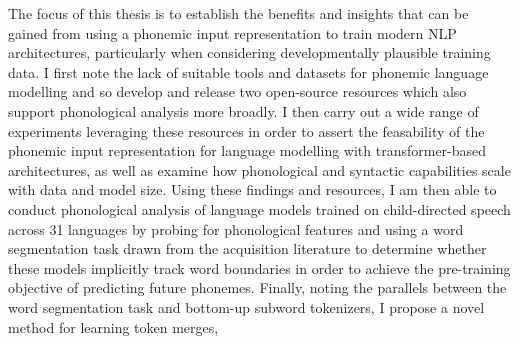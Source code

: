 
The focus of this thesis is to establish the benefits and insights that can be gained from using a phonemic input representation to train modern NLP architectures, particularly when considering developmentally plausible training data. I first note the lack of suitable tools and datasets for phonemic language modelling and so develop and release two open-source resources which also support phonological analysis more broadly. I then carry out a wide range of experiments leveraging these resources in order to assert the feasability of the phonemic input representation for language modelling with transformer-based architectures, as well as examine how phonological and syntactic capabilities scale with data and model size. Using these findings and resources, I am then able to conduct phonological analysis of language models trained on child-directed speech across 31 languages by probing for phonological features and using a word segmentation task drawn from the acquisition literature to determine whether these models implicitly track word boundaries in order to achieve the pre-training objective of predicting future phonemes. Finally, noting the parallels between the word segmentation task and bottom-up subword tokenizers, I propose a novel method for learning token merges, 













